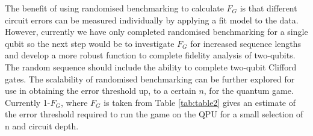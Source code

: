 The benefit of using randomised benchmarking to calculate $F_{G}$ is that different circuit errors can be measured individually by applying a fit model to the data. However, currently we have only completed randomised benchmarking for a single qubit so the next step would be to investigate $F_{G}$ for increased sequence lengths and develop a more robust function to complete fidelity analysis of two-qubits. The random sequence should include the ability to complete two-qubit Clifford gates. The scalability of randomised benchmarking can be further explored for use in obtaining the error threshold up, to a certain $n$, for the quantum game. Currently 1-$F_{G}$, where $F_{G}$ is taken from Table \ref{tab:table2} gives an estimate of the error threshold required to run the game on the QPU for a small selection of n and circuit depth.

      


%




